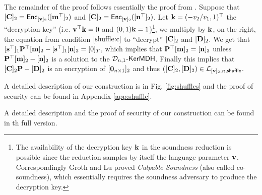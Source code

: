 The remainder of the proof follows essentially the proof from \cite{AC:GroLu07}. Suppose that $[\mathbf{{C}}]_2=\mathsf{Enc}_{[\mathbf{v}]_2}([\mathbf{{m}}^\top]_2)$ and $[\mathbf{{C}}]_2=\mathsf{Enc}_{[\mathbf{v}]_2}([\mathbf{{n}}^\top]_2)$. Let $\mathbf{k}=(-v_2/v_1,1)^\top$ the ``decryption key'' (i.e. $\mathbf{v}^\top\mathbf{k}=0$ and $(0,1)\mathbf{k}=1$)\footnote{The availability of the decryption key $\mathbf{k}$ in the soundness reduction is possible since the reduction samples by itself the language parameter $\mathbf{v}$. Correspondingly Groth and Lu \cite{AC:GroLu07} proved \emph{Culpable Soundness} (also called co-soundness), which essentially requires the soundness adversary to produce the decryption key.}, we multiply by $\mathbf{{k}}$, on the right, the equation from condition $\ref{shuffle:c}$ to ``decrypt'' $[\mathbf{{C}}]_2$ and $[\mathbf{{D}}]_2$. We get that
$[\mathbf{s}^\top]_1\mathbf{{P}}^\top[\mathbf{{m}}]_2-[\mathbf{s}^\top]_1[\mathbf{{n}}]_2=[0]_T$, which implies that $\mathbf{{P}}^\top[\mathbf{{m}}]_2=[\mathbf{{n}}]_2$ unless $\mathbf{{P}}^\top[\mathbf{{m}}]_2-[\mathbf{{n}}]_2$ is a solution to the $\mathcal{D}_{n,1}\mbox{-}\mathsf{KerMDH}$. Finally this implies that $[\mathbf{{C}}]_2\mathbf{{P}}-[\mathbf{{D}}]_2$ is an encryption of $[\mathbf{{0}}_{n\times 1}]_2$ and thus $([\mathbf{{C}}]_2,[\mathbf{{D}}]_2)\in\mathcal{L}_{[\mathbf{v}]_2,n,\mathsf{shuffle}}$.

\iffull
A detailed description of our construction is in Fig. \ref{fig:shuffles} and the proof of security can be found in Appendix \ref{app:shuffle}.

\else
A detailed description and the proof of security of our construction can be found in th full version.
\fi
